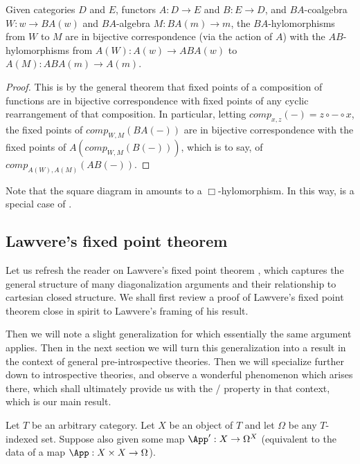 \begin{theorem}\label{HylomorphismTransfer}
Given categories $D$ and $E$, functors $A : D \to E$ and $B : E \to D$, and $BA$-coalgebra $W : w \to BA(w)$ and $BA$-algebra $M : BA(m) \to m$, the $BA$-hylomorphisms from $W$ to $M$ are in bijective correspondence (via the action of $A$) with the $AB$-hylomorphisms from $A(W) : A(w) \to ABA(w)$ to $A(M) : ABA(m) \to A(m)$.
\end{theorem}
\begin{proof}
This is by the general theorem that fixed points of a composition of functions are in bijective correspondence with fixed points of any cyclic rearrangement of that composition. In particular, letting $comp_{x, z}(-) = z \circ - \circ x$, the fixed points of $comp_{W, M}(BA(-))$ are in bijective correspondence with the fixed points of $A(comp_{W, M}(B(-)))$, which is to say, of $comp_{A(W), A(M)}(AB(-))$.
\end{proof}

Note that the square diagram in  amounts to a $\Box$-hylomorphism. In this way,  is a special case of .


\subsection{Lawvere's fixed point theorem}\label{LawvereFPTSection}
Let us refresh the reader on Lawvere's fixed point theorem \autocite{lawvere1969diagonal}, which captures the general structure of many diagonalization arguments and their relationship to cartesian closed structure. We shall first review a proof of Lawvere's fixed point theorem close in spirit to Lawvere's framing of his result.

Then we will note a slight generalization for which essentially the same argument applies. Then in the next section we will turn this generalization into a result in the context of general pre-introspective theories. Then we will specialize further down to introspective theories, and observe a wonderful  phenomenon which arises there, which shall ultimately provide us with the \Loeb/ property in that context, which is our main result.

\label{LawveresFixedPointTheorem}
Let $T$ be an arbitrary category. Let $X$ be an object of $T$ and let $\Omega$ be any $T$-indexed set. Suppose also given some map $\App' : X \to \Omega^X$ (equivalent to the data of a map $\App : X \times X \to \Omega$).

